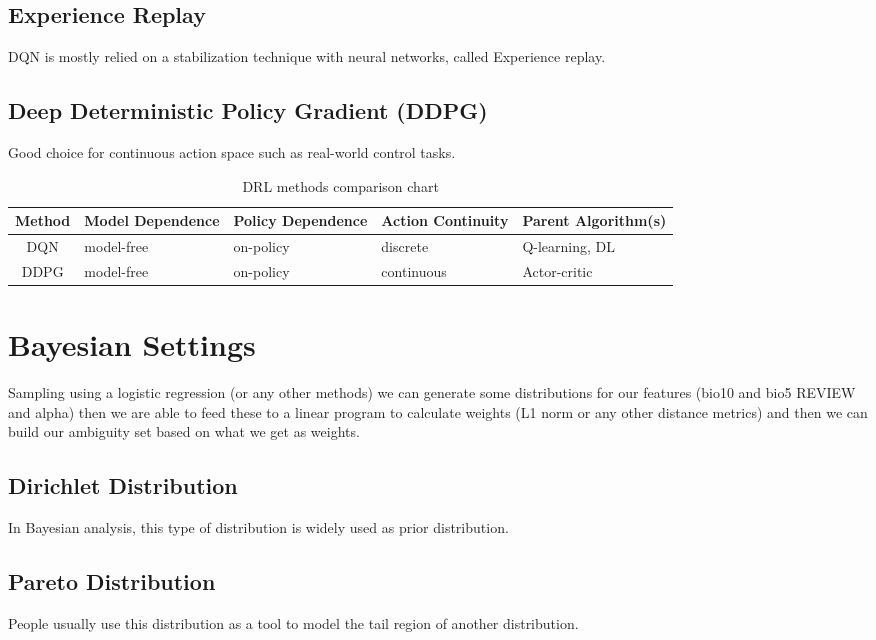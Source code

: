 \documentclass[a4paper,12pt]{article}
\begin{document}
\subsection{Experience Replay}
DQN is mostly relied on a stabilization technique with neural networks, called Experience replay.



\subsection{Deep Deterministic Policy Gradient (DDPG)}
Good choice for continuous action space such as real-world control tasks.

\begin{table}
    \centering
    \begin{tabular}{|c|L|L|L|L|}
        \hline
        \textbf{Method}  &    \textbf{Model Dependence}    &   \textbf{Policy Dependence}   &   \textbf{Action Continuity}  & \textbf{Parent Algorithm(s)}\\
        \hline
        \hline
        DQN &   model-free  &   on-policy   &   discrete    &   Q-learning, DL\\
        \hline
        DDPG    &   model-free  &   on-policy   &   continuous  &   Actor-critic\\
        \hline
    \end{tabular}
    \caption{DRL methods comparison chart}
    \label{tab:dqn vs. ddpg}
\end{table}


\section{Bayesian Settings}
Sampling using a logistic regression (or any other methods) we can generate some distributions for our features (bio10 and bio5 REVIEW and alpha) then we are able to feed these to a linear program to calculate weights (L1 norm or any other distance metrics) and then we can build our ambiguity set based on what we get as weights.
\subsection{Dirichlet Distribution}
    In Bayesian analysis, this type of distribution is widely used as prior distribution.
    
\subsection{Pareto Distribution}
    People usually use this distribution as a tool to model the tail region of another distribution.
\end{document}

